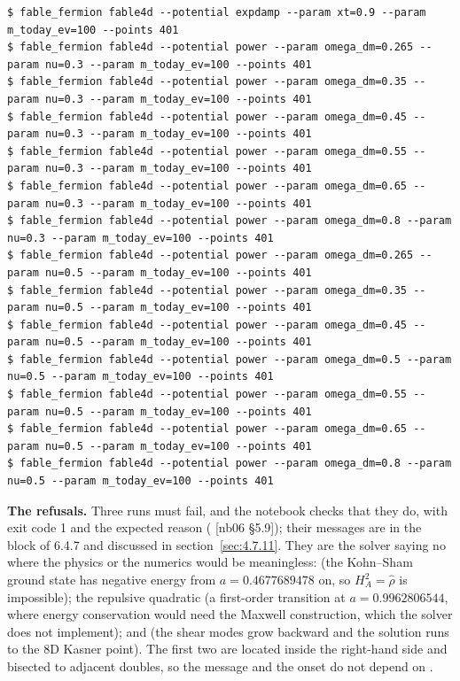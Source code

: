 \begin{Verbatim}
$ fable_fermion fable4d --potential expdamp --param xt=0.9 --param m_today_ev=100 --points 401
$ fable_fermion fable4d --potential power --param omega_dm=0.265 --param nu=0.3 --param m_today_ev=100 --points 401
$ fable_fermion fable4d --potential power --param omega_dm=0.35 --param nu=0.3 --param m_today_ev=100 --points 401
$ fable_fermion fable4d --potential power --param omega_dm=0.45 --param nu=0.3 --param m_today_ev=100 --points 401
$ fable_fermion fable4d --potential power --param omega_dm=0.55 --param nu=0.3 --param m_today_ev=100 --points 401
$ fable_fermion fable4d --potential power --param omega_dm=0.65 --param nu=0.3 --param m_today_ev=100 --points 401
$ fable_fermion fable4d --potential power --param omega_dm=0.8 --param nu=0.3 --param m_today_ev=100 --points 401
$ fable_fermion fable4d --potential power --param omega_dm=0.265 --param nu=0.5 --param m_today_ev=100 --points 401
$ fable_fermion fable4d --potential power --param omega_dm=0.35 --param nu=0.5 --param m_today_ev=100 --points 401
$ fable_fermion fable4d --potential power --param omega_dm=0.45 --param nu=0.5 --param m_today_ev=100 --points 401
$ fable_fermion fable4d --potential power --param omega_dm=0.5 --param nu=0.5 --param m_today_ev=100 --points 401
$ fable_fermion fable4d --potential power --param omega_dm=0.55 --param nu=0.5 --param m_today_ev=100 --points 401
$ fable_fermion fable4d --potential power --param omega_dm=0.65 --param nu=0.5 --param m_today_ev=100 --points 401
$ fable_fermion fable4d --potential power --param omega_dm=0.8 --param nu=0.5 --param m_today_ev=100 --points 401
\end{Verbatim}

\textbf{The refusals.} Three runs must fail, and the notebook checks that they do, with exit code 1 and the expected reason ( [nb06 \S{}5.9]); their messages are in the block of 6.4.7 and discussed in section~\ref{sec:4.7.11}. They are the solver saying no where the physics or the numerics would be meaningless:  (the Kohn--Sham ground state has negative energy from $a = 0.4677689478$ on, so $H_A^{2} = \hat\rho$ is impossible); the repulsive quadratic (a first-order transition at $a = 0.9962806544$, where energy conservation would need the Maxwell construction, which the solver does not implement); and  (the shear modes grow backward and the solution runs to the 8D Kasner point). The first two are located inside the right-hand side and bisected to adjacent doubles, so the message and the onset do not depend on .

